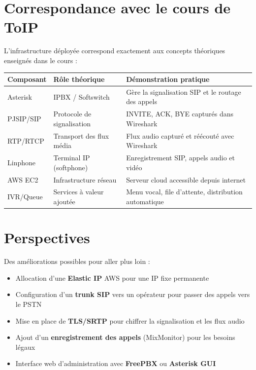 \documentclass[a4paper,11pt]{report}
\begin{document}
\section{Correspondance avec le cours de ToIP}

L'infrastructure déployée correspond exactement aux concepts théoriques enseignés dans le cours :

\begin{center}
\begin{tabularx}{\textwidth}{llX}
\toprule
\rowcolor{primarylight}\textbf{Composant} & \textbf{Rôle théorique} & \textbf{Démonstration pratique}\\
\midrule
Asterisk & IPBX / Softswitch & Gère la signalisation SIP et le routage des appels\\
PJSIP/SIP & Protocole de signalisation & INVITE, ACK, BYE capturés dans Wireshark\\
RTP/RTCP & Transport des flux média & Flux audio capturé et réécouté avec Wireshark\\
Linphone & Terminal IP (softphone) & Enregistrement SIP, appels audio et vidéo\\
AWS EC2 & Infrastructure réseau & Serveur cloud accessible depuis internet\\
IVR/Queue & Services à valeur ajoutée & Menu vocal, file d'attente, distribution automatique\\
\bottomrule
\end{tabularx}
\end{center}

\section{Perspectives}

Des améliorations possibles pour aller plus loin :
\begin{itemize}[leftmargin=1.4em, itemsep=3pt]
  \item Allocation d'une \textbf{Elastic IP} AWS pour une IP fixe permanente
  \item Configuration d'un \textbf{trunk SIP} vers un opérateur pour passer des appels vers le PSTN
  \item Mise en place de \textbf{TLS/SRTP} pour chiffrer la signalisation et les flux audio
  \item Ajout d'un \textbf{enregistrement des appels} (MixMonitor) pour les besoins légaux
  \item Interface web d'administration avec \textbf{FreePBX} ou \textbf{Asterisk GUI}
\end{itemize}
\end{document}
